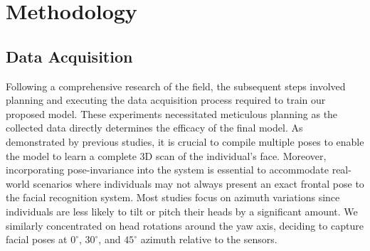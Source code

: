 \documentclass{mpaper}
\begin{document}
\section{Methodology}
\subsection{Data Acquisition}
Following a comprehensive research of the field, the subsequent steps involved planning and executing the data acquisition process required to train our proposed model. These experiments necessitated meticulous planning as the collected data directly determines the efficacy of the final model. As demonstrated by previous studies, it is crucial to compile multiple poses to enable the model to learn a complete 3D scan of the individual's face. Moreover, incorporating pose-invariance into the system is essential to accommodate real-world scenarios where individuals may not always present an exact frontal pose to the facial recognition system. Most studies focus on azimuth variations since individuals are less likely to tilt or pitch their heads by a significant amount. We similarly concentrated on head rotations around the yaw axis, deciding to capture facial poses at $0^\circ$, $30^\circ$, and $45^\circ$ azimuth relative to the sensors.
\end{document}
